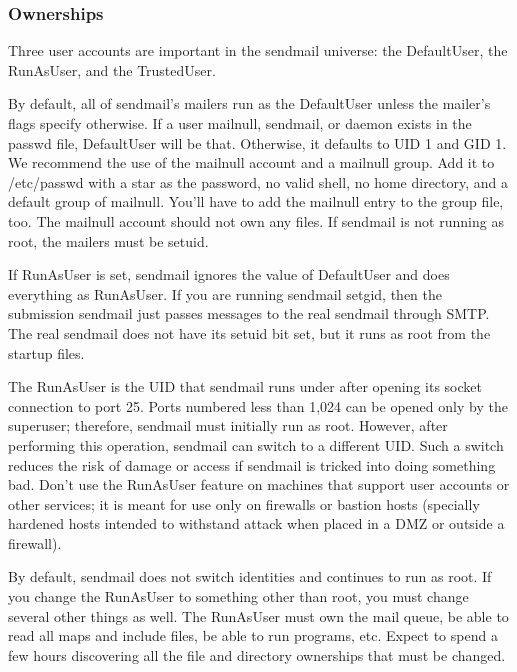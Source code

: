 \subsubsection[Ownerships]{\texorpdfstring{\protect\hypertarget{part0026_split_038.htmlux5cux23_idTextAnchor1102}{}{}Ownerships}{Ownerships}}

Three user accounts are important in the {sendmail} universe: the
{DefaultUser}, the {RunAsUser}, and the {TrustedUser}.

By default, all of {sendmail}'s mailers run as the {DefaultUser} unless
the mailer's flags specify otherwise. If a user mailnull, sendmail, or
daemon exists in the {passwd} file, {DefaultUser} will be that.
Otherwise, it defaults to UID 1 and GID 1. We recommend the use of the
mailnull account and a mailnull group. Add it to {/etc/passwd} with a
star as the password, no valid shell, no home directory, and a default
group of mailnull. You'll have to add the mailnull entry to the {group}
file, too. The mailnull account should not own any files. If {sendmail}
is not running as root, the mailers must be setuid.

If {RunAsUser} is set, {sendmail} ignores the value of {DefaultUser} and
does everything as {RunAsUser}. If you are running {sendmail} setgid,
then the submission {sendmail} just passes messages to the real
{sendmail} through SMTP. The real {sendmail} does not have its setuid
bit set, but it runs as root from the startup files.

The {RunAsUser} is the UID that {sendmail} runs under after opening its
socket connection to port 25. Ports numbered less than 1,024 can be
opened only by the superuser; therefore, {sendmail} must initially run
as root. However, after performing this operation, {sendmail} can switch
to a different UID. Such a switch reduces the risk of damage or access
if {sendmail} is tricked into doing something bad. Don't use the
{RunAsUser} feature on machines that support user accounts or other
services; it is meant for use only on firewalls or bastion hosts
(specially hardened hosts intended to withstand attack when placed in a
DMZ or outside a firewall).

By default, {sendmail} does not switch identities and continues to run
as root. If you change the {RunAsUser} to something other than root, you
must change several other things as well. The {RunAsUser} must own the
mail queue, be able to read all maps and include files, be able to run
programs, etc. Expect to spend a few hours discovering all the file and
directory ownerships that must be changed.

